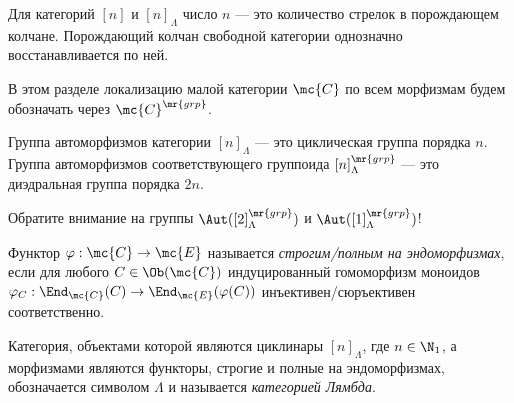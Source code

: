 \documentclass[
	extrafontsizes,
	11pt,
	hyphens,
]{memoir}
\begin{document}
\begin{observation}
Для категорий \([n]\) и \([n]_\Lambda\) число \(n\) --- это количество стрелок в порождающем колчане.
Порождающий колчан свободной категории однозначно восстанавливается по ней.
\end{observation}

\begin{notation}
В этом разделе локализацию малой категории \(\mc{C}\) по всем морфизмам будем обозначать через
\(\mc{C}^\mr{grp}\).
\end{notation}

\begin{observation}
Группа автоморфизмов категории \([n]_\Lambda\) --- это циклическая группа порядка \(n\).
Группа автоморфизмов соответствующего группоида \([n]_\Lambda^\mr{grp}\) --- это диэдральная группа порядка \(2n\).
\end{observation}

\begin{remark}
Обратите внимание на группы \(\Aut([2]_\Lambda^\mr{grp})\) и \(\Aut([1]_\Lambda^\mr{grp})\)!
\end{remark}



\begin{definition}
Функтор \(\varphi : \mc{C} \to \mc{E}\) называется \emph{стро\-гим/пол\-ным на эндоморфизмах}, если для любого \(C \in \Ob(\mc{C})\) индуцированный гомоморфизм моноидов
\(\varphi_C : \End_\mc{C}(C) \to \End_\mc{E}(\varphi(C))\)
инъективен/сюръективен соответственно.
\end{definition}

\begin{definition}
Категория, объектами которой являются циклинары \([n]_\Lambda\), где \(n \in \N_1\), а морфизмами
являются функторы,
строгие и полные на эндоморфизмах,
обозначается символом \(\Lambda\) и называется \emph{категорией Лямбда}.
\end{definition}
\end{document}
